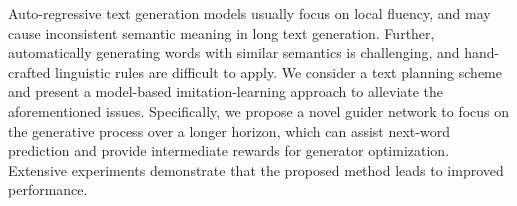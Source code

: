 Auto-regressive text generation models usually focus on local fluency, and may cause inconsistent semantic meaning in long text generation. Further, automatically generating words with similar semantics is challenging, and hand-crafted linguistic rules are difficult to apply. We consider a text planning scheme and present a model-based imitation-learning approach to alleviate the aforementioned issues. Specifically, we propose a novel guider network to focus on the generative process over a longer horizon, which can assist next-word prediction and provide intermediate rewards for generator optimization. Extensive experiments demonstrate that the proposed method leads to improved performance.

